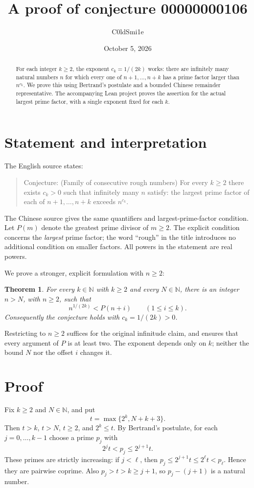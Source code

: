 \documentclass[11pt]{article}
\title{A proof of conjecture 00000000106}
\author{C0ldSmi1e}
\date{October 5, 2026}
\newtheorem{theorem}{Theorem}
\newcommand{\N}{\mathbb N}
\begin{document}
\maketitle
\begin{abstract}
For each integer $k\ge2$, the exponent $c_k=1/(2k)$ works: there are
infinitely many natural numbers $n$ for which every one of
$n+1,\ldots,n+k$ has a prime factor larger than $n^{c_k}$.
We prove this using Bertrand's postulate and a bounded Chinese remainder
representative. The accompanying Lean project proves the assertion for the
actual largest prime factor, with a single exponent fixed for each $k$.
\end{abstract}

\section{Statement and interpretation}
The English source states:
\begin{quote}
Conjecture: (Family of consecutive rough numbers) For every $k\ge2$ there
exists $c_k>0$ such that infinitely many $n$ satisfy: the largest prime factor
of each of $n+1,\ldots,n+k$ exceeds $n^{c_k}$.
\end{quote}
The Chinese source gives the same quantifiers and largest-prime-factor
condition. Let $P(m)$ denote the greatest prime divisor of $m\ge2$.
The explicit condition concerns the \emph{largest} prime factor; the word
``rough'' in the title introduces no additional condition on smaller factors.
All powers in the statement are real powers.

We prove a stronger, explicit formulation with $n\ge2$:
\begin{theorem}\label{thm:main}
For every $k\in\N$ with $k\ge2$ and every $N\in\N$, there is an integer
$n>N$, with $n\ge2$, such that
\[
  n^{1/(2k)}<P(n+i)\qquad(1\le i\le k).
\]
Consequently the conjecture holds with $c_k=1/(2k)>0$.
\end{theorem}
Restricting to $n\ge2$ suffices for the original infinitude claim, and ensures
that every argument of $P$ is at least two. The exponent depends only on $k$;
neither the bound $N$ nor the offset $i$ changes it.

\section{Proof}
Fix $k\ge2$ and $N\in\N$, and put
\[
 t=\max\{2^k,N+k+3\}.
\]
Then $t>k$, $t>N$, $t\ge2$, and $2^k\le t$.
By Bertrand's postulate, for each $j=0,\ldots,k-1$ choose a prime $p_j$ with
\begin{equation}\label{eq:primes}
  2^j t<p_j\le 2^{j+1}t.
\end{equation}
These primes are strictly increasing: if $j<\ell$, then
$p_j\le2^{j+1}t\le2^\ell t<p_\ell$. Hence they are pairwise coprime.
Also $p_j>t>k\ge j+1$, so $p_j-(j+1)$ is a natural number.
\end{document}
